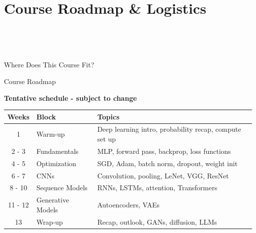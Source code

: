 \documentclass[compress, xcolor={svgnames}, aspectratio=169, smaller]{beamer}
\newcommand{\CommonPath}{../../Common}
\begin{document}
\section{Course Roadmap \& Logistics}

\begin{frame}{\ }

\begin{center}
\vspace{1em}
\\[1em]
\end{center}

\end{frame}

\begin{frame}{Where Does This Course Fit?}

\resizebox{\textwidth}{!}{

}

\end{frame}

\begin{frame}{Course Roadmap}

\begin{center}

\textbf{Tentative schedule - subject to change}

\begin{tabular}{clll}
    \toprule
    \textbf{Weeks} & \textbf{Block} & \textbf{Topics} \\
    \midrule
    1  & Warm-up       & Deep learning intro, probability recap, compute set up \\
    2 - 3  & Fundamentals       & MLP, forward pass, backprop, loss functions \\
    4 - 5  & Optimization       & SGD, Adam, batch norm, dropout, weight init \\
    6 - 7  & CNNs               & Convolution, pooling, LeNet, VGG, ResNet \\
    8 - 10 & Sequence Models    & RNNs, LSTMs, attention, Transformers \\
    11 - 12 & Generative Models & Autoencoders, VAEs \\
    13 & Wrap-up           & Recap, outlook, GANs, diffusion, LLMs \\
    \bottomrule
\end{tabular}
\end{center}

\end{frame}
\end{document}
